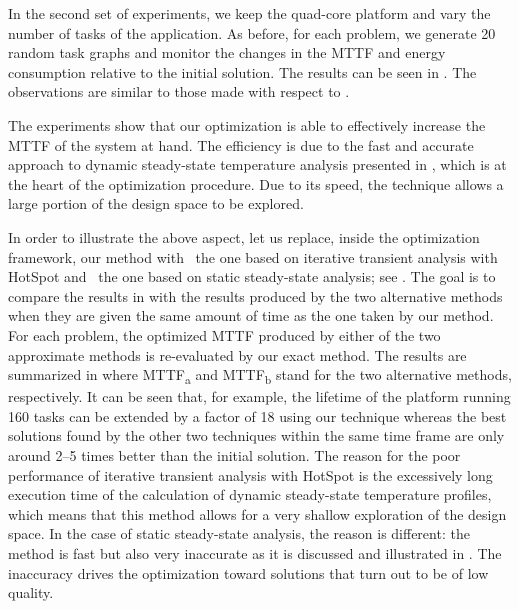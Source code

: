In the second set of experiments, we keep the quad-core platform and vary the
number of tasks \nt of the application. As before, for each problem, we generate
20 random task graphs and monitor the changes in the \ac{MTTF} and energy
consumption relative to the initial solution. The results can be seen in
. The observations are similar to those made with
respect to .

The experiments show that our optimization is able to effectively increase the
\ac{MTTF} of the system at hand. The efficiency is due to the fast and accurate
approach to dynamic steady-state temperature analysis presented in
, which is at the heart of the optimization
procedure. Due to its speed, the technique allows a large portion of the design
space to be explored.

In order to illustrate the above aspect, let us replace, inside the optimization
framework, our method with \one~the one based on iterative transient analysis
with HotSpot and \two~the one based on static steady-state analysis; see
. The goal is to compare the results in
 with the results produced by the two alternative
methods when they are given the same amount of time as the one taken by our
method. For each problem, the optimized \ac{MTTF} produced by either of the two
approximate methods is re-evaluated by our exact method. The results are
summarized in  where \ac{MTTF}\textsubscript{a}
and \ac{MTTF}\textsubscript{b} stand for the two alternative methods,
respectively. It can be seen that, for example, the lifetime of the platform
running 160 tasks can be extended by a factor of 18 using our technique whereas
the best solutions found by the other two techniques within the same time frame
are only around 2--5 times better than the initial solution. The reason for the
poor performance of iterative transient analysis with HotSpot is the excessively
long execution time of the calculation of dynamic steady-state temperature
profiles, which means that this method allows for a very shallow exploration of
the design space. In the case of static steady-state analysis, the reason is
different: the method is fast but also very inaccurate as it is discussed and
illustrated in . The inaccuracy drives the
optimization toward solutions that turn out to be of low quality.

